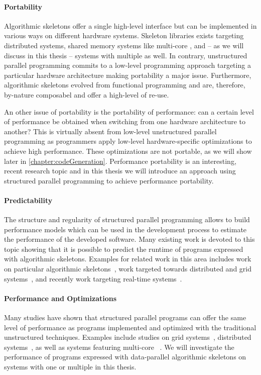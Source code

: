 \paragraph{Portability}
Algorithmic skeletons offer a single high-level interface but can be implemented in various ways on different hardware systems.
Skeleton libraries exists targeting distributed systems, shared memory systems like multi-core \CPUs, and -- as we will discuss in this thesis -- systems with multiple \GPUs as well.
In contrary, unstructured parallel programming commits to a low-level programming approach targeting a particular hardware architecture making portability a major issue.
Furthermore, algorithmic skeletons evolved from functional programming and are, therefore, by-nature composabel and offer a high-level of re-use.

An other issue of portability is the portability of performance:
can a certain level of performance be obtained when switching from one hardware architecture to another?
This is virtually absent from low-level unstructured parallel programming as programmers apply low-level hardware-specific optimizations to achieve high performance.
These optimizations are not portable, as we will show later in \autoref{chapter:codeGeneration}.
Performance portability is an interesting, recent research topic and in this thesis we will introduce an approach using structured parallel programming to achieve performance portability.

\paragraph{Predictability}
The structure and regularity of structured parallel programming allows to build performance models which can be used in the development process to estimate the performance of the developed software.
Many existing work is devoted to this topic showing that it is possible to predict the runtime of programs expressed with algorithmic skeletons.
Examples for related work in this area includes work on particular algorithmic skeletons~\cite{BischofGK03}, work targeted towards distributed and grid systems~\cite{Alt2007,JavedL11}, and recently work targeting real-time systems~\cite{StegmeierFrJAUn2015}.

\paragraph{Performance and Optimizations}
Many studies have shown that structured parallel programs can offer the same level of performance as programs implemented and optimized with the traditional unstructured techniques.
Examples include studies on grid systems~\cite{Alt2007}, distributed systems~\cite{}, as well as systems featuring multi-core \CPUs~\cite{}.
We will investigate the performance of programs expressed with data-parallel algorithmic skeletons on systems with one or multiple \GPUs in this thesis.

